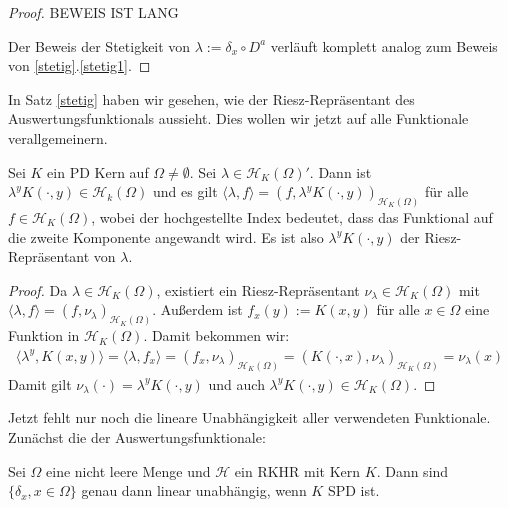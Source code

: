 \begin{proof}
BEWEIS IST LANG

Der Beweis der Stetigkeit von $\lambda := \delta_x \circ D^a$ verläuft komplett analog zum Beweis von \ref{stetig}.\ref{stetig1}.
\end{proof}

In Satz \ref{stetig} haben wir gesehen, wie der Riesz-Repräsentant des Auswertungsfunktionals aussieht. Dies wollen wir jetzt auf alle Funktionale verallgemeinern.

\begin{theorem}
\label{Riesz}
Sei $K$ ein \ac{PD} Kern auf $\Omega \neq \emptyset$. Sei $\lambda \in \mathcal{H}_K (\Omega)'$. Dann ist $\lambda^y K(\cdot,y) \in \mathcal{H}_k(\Omega)$ und es gilt $\langle \lambda,f \rangle = \left(f,\lambda^y K(\cdot,y)\right)_{\mathcal{H}_K(\Omega)}$ für alle $f \in \mathcal{H}_K(\Omega)$, wobei der hochgestellte Index bedeutet, dass das Funktional auf die zweite Komponente angewandt wird. Es ist also $\lambda^y K(\cdot,y)$ der Riesz-Repräsentant von $\lambda$.
\end{theorem}

\begin{proof}
Da $\lambda \in \mathcal{H}_K(\Omega)$, existiert ein Riesz-Repräsentant $\nu_\lambda \in \mathcal{H}_K(\Omega)$ mit $\langle \lambda ,f \rangle = \left(f, \nu_\lambda\right)_{\mathcal{H}_K(\Omega)}$. Außerdem ist $f_x(y) := K(x,y)$ für alle $x \in \Omega$ eine Funktion in $\mathcal{H}_K (\Omega)$. Damit bekommen wir:
\begin{align*}
\langle \lambda^y, K(x,y) \rangle = \langle \lambda,f_x \rangle = \left(f_x, \nu_\lambda\right)_{\mathcal{H}_K (\Omega)} = \left(K(\cdot,x), \nu_\lambda\right)_{\mathcal{H}_K (\Omega)} = \nu_\lambda(x)
\end{align*}
Damit gilt $\nu_\lambda(\cdot) = \lambda^y K(\cdot,y)$ und auch $\lambda^y K(\cdot,y) \in \mathcal{H}_K (\Omega)$.
\end{proof}

Jetzt fehlt nur noch die lineare Unabhängigkeit aller verwendeten Funktionale. Zunächst die der Auswertungsfunktionale:
\begin{theorem}
Sei $\Omega$ eine nicht leere Menge und $\mathcal{H}$ ein \ac{RKHR} mit Kern $K$. Dann sind $\{\delta_x,x\in \Omega\}$ genau dann linear unabhängig, wenn $K$ \ac{SPD} ist.
\end{theorem}

